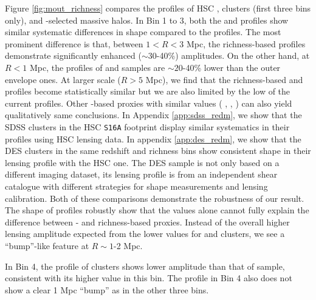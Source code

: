 \documentclass[fleqn,usenatbib,useAMS]{mnras}
\begin{document}
    Figure \ref{fig:mout_richness} compares the \dsigma{} profiles of HSC \redm{}, \camira{}
    clusters (first three bins only), and -selected massive halos.
    In Bin 1 to 3, both the \redm{} and \camira{} \dsigma{} profiles show similar systematic
    differences in shape compared to the  profiles.
    The most prominent difference is that, between $1 < R < 3$ Mpc, the richness-based \dsigma{}
    profiles demonstrate significantly enhanced ($\sim 30$-40\%) \dsigma{} amplitudes.
    On the other hand, at $R < 1$ Mpc, the \dsigma{} profiles of \redm{} and \camira{} samples
    are $\sim 20$-40\% lower than the outer envelope \mstar{} ones.
    At larger scale ($R > 5$ Mpc), we find that the richness-based and  \dsigma{}
    profiles become statistically similar but we are also limited by the low \snratio{} of the
    current profiles.
    Other \mstar{}-based proxies with similar \sigmvir{} values (\eg{} , \masap{},
    ) can also yield qualitatively same conclusions.
    In Appendix \ref{app:sdss_redm}, we show that the SDSS \redm{} clusters in the HSC
    \texttt{S16A} footprint display similar systematics in their \dsigma{} profiles using HSC
    lensing data. 
    In appendix \ref{app:des_redm}, we show that the DES \redm{} clusters in the same 
    redshift and richness bins show consistent shape in their lensing profile with the HSC one.
    The DES sample is not only based on a different imaging dataset, its lensing profile 
    is from an independent shear catalogue with different strategies for shape measurements and 
    lensing calibration.
    Both of these comparisons demonstrate the robustness of our result.
    The shape of \dsigma{} profiles robustly show that the \sigmvir{} values alone cannot fully
    explain the difference between \mstar{}- and richness-based \mvir{} proxies.
    Instead of the overall higher lensing amplitude expected from the lower \sigmvir{} values
    for \redm{} and \camira{} clusters, we see a ``bump''-like feature at $R \sim 1$-2 Mpc.

    In Bin 4, the \dsigma{} profile of \redm{} clusters shows lower amplitude than that of 
     sample, consistent with its higher \sigmvir{} value in this bin. 
    The \dsigma{} profile in Bin 4 also does not show a clear 1 Mpc ``bump'' as in the other three
    bins.
    
\end{document}
